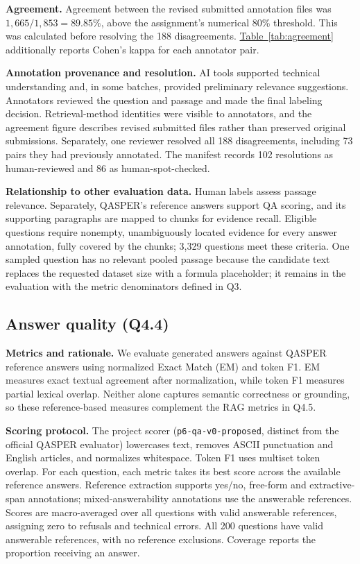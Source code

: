 \textbf{Agreement.} Agreement between the revised submitted annotation files was $1{,}665/1{,}853 = 89.85\%$, above the assignment's numerical 80\% threshold. This was calculated before resolving the 188 disagreements. \hyperref[tab:agreement]{Table~\ref*{tab:agreement}} additionally reports Cohen's kappa for each annotator pair.



\textbf{Annotation provenance and resolution.} AI tools supported technical understanding and, in some batches, provided preliminary relevance suggestions. Annotators reviewed the question and passage and made the final labeling decision. Retrieval-method identities were visible to annotators, and the agreement figure describes revised submitted files rather than preserved original submissions. Separately, one reviewer resolved all 188 disagreements, including 73 pairs they had previously annotated. The manifest records 102 resolutions as human-reviewed and 86 as human-spot-checked.

\textbf{Relationship to other evaluation data.} Human labels assess passage relevance. Separately, QASPER's reference answers support QA scoring, and its supporting paragraphs are mapped to chunks for evidence recall. Eligible questions require nonempty, unambiguously located evidence for every answer annotation, fully covered by the chunks; 3,329 questions meet these criteria. One sampled question has no relevant pooled passage because the candidate text replaces the requested dataset size with a formula placeholder; it remains in the evaluation with the metric denominators defined in Q3.

% 

\subsection{Answer quality (Q4.4)}
\textbf{Metrics and rationale.} We evaluate generated answers against QASPER reference answers using normalized Exact Match (EM) and token F1. EM measures exact textual agreement after normalization, while token F1 measures partial lexical overlap. Neither alone captures semantic correctness or grounding, so these reference-based measures complement the RAG metrics in Q4.5.

\textbf{Scoring protocol.} The project scorer (\texttt{p6-qa-v0-proposed}, distinct from the official QASPER evaluator) lowercases text, removes ASCII punctuation and English articles, and normalizes whitespace. Token F1 uses multiset token overlap. For each question, each metric takes its best score across the available reference answers. Reference extraction supports yes/no, free-form and extractive-span annotations; mixed-answerability annotations use the answerable references. Scores are macro-averaged over all questions with valid answerable references, assigning zero to refusals and technical errors. All 200 questions have valid answerable references, with no reference exclusions. Coverage reports the proportion receiving an answer.

